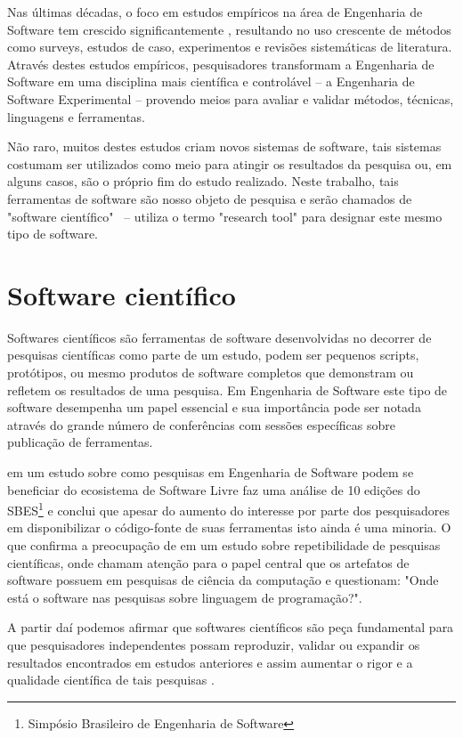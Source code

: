 \documentclass[qual, classic, a4paper]{ufbathesis}
\begin{document}
Nas últimas décadas, o foco em estudos empíricos na área de Engenharia de
Software tem crescido significantemente \cite{Stol2015}, resultando no uso
crescente de métodos como surveys, estudos de caso, experimentos e revisões
sistemáticas de literatura. Através destes estudos empíricos, pesquisadores
transformam a Engenharia de Software em uma disciplina mais científica e
controlável -- a  Engenharia de Software Experimental -- provendo meios para
avaliar e validar métodos, técnicas, linguagens e ferramentas.

Não raro, muitos destes estudos criam novos sistemas de software, tais
sistemas costumam ser utilizados como meio para atingir os resultados da
pesquisa ou, em alguns casos, são o próprio fim do estudo realizado. Neste
trabalho, tais ferramentas de software são nosso objeto de pesquisa e serão
chamados de "software científico" \ --  utiliza o termo
"research tool" para designar este mesmo tipo de software.

\section{Software científico}

Softwares científicos são ferramentas de software desenvolvidas no decorrer de
pesquisas científicas como parte de um estudo, podem ser pequenos scripts,
protótipos, ou mesmo produtos de software completos que demonstram ou refletem
os resultados de uma pesquisa. Em Engenharia de Software este tipo de software
desempenha um papel essencial e sua importância pode ser notada através do
grande número de conferências com sessões específicas sobre publicação de
ferramentas.

 em um estudo sobre como pesquisas em Engenharia de
Software podem se beneficiar do ecosistema de Software Livre faz uma análise
de 10 edições do SBES\footnote{Simpósio Brasileiro de Engenharia de Software}
e conclui que apesar do aumento do interesse por parte dos pesquisadores em
disponibilizar o código-fonte de suas ferramentas isto ainda é uma minoria. O
que confirma a preocupação de  em um estudo
sobre repetibilidade de pesquisas científicas, onde chamam atenção para o papel
central que os artefatos de software possuem em pesquisas de ciência da
computação e questionam: "Onde está o software nas pesquisas sobre linguagem
de programação?".

A partir daí podemos afirmar que softwares científicos são peça fundamental
para que pesquisadores independentes possam reproduzir, validar ou expandir os
resultados encontrados em estudos anteriores e assim aumentar o rigor e a
qualidade científica de tais pesquisas \cite{Vitek2011}.
\end{document}
